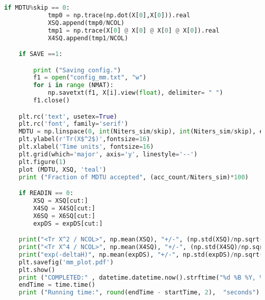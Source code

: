 \begin{footnotesize}
\begin{lstlisting}[language=Python]
        if MDTU%skip == 0:
            tmp0 = np.trace(np.dot(X[0],X[0])).real
            XSQ.append(tmp0/NCOL)
            tmp1 = np.trace(X[0] @ X[0] @ X[0] @ X[0]).real
            X4SQ.append(tmp1/NCOL)

    if SAVE ==1:

        print ("Saving config.")
        f1 = open("config_mm.txt", "w")
        for i in range (NMAT):
            np.savetxt(f1, X[i].view(float), delimiter= " ")  
        f1.close()

    plt.rc('text', usetex=True)
    plt.rc('font', family='serif')
    MDTU = np.linspace(0, int(Niters_sim/skip), int(Niters_sim/skip), endpoint=True)
    plt.ylabel(r'Tr(X$^2$)',fontsize=16)
    plt.xlabel('Time units', fontsize=16)
    plt.grid(which='major', axis='y', linestyle='--')
    plt.figure(1)
    plot (MDTU, XSQ, 'teal') 
    print ("Fraction of MDTU accepted", (acc_count/Niters_sim)*100) 

    if READIN == 0:
        XSQ = XSQ[cut:]
        X4SQ = X4SQ[cut:]
        X6SQ = X6SQ[cut:]
        expDS = expDS[cut:] 

    print("<Tr X^2 / NCOL>", np.mean(XSQ), "+/-", (np.std(XSQ)/np.sqrt(np.size(XSQ) - 1.0)))
    print("<Tr X^4 / NCOL>", np.mean(X4SQ), "+/-", (np.std(X4SQ)/np.sqrt(np.size(X4SQ) - 1.0)))
    print("exp(-deltaH)", np.mean(expDS), "+/-", np.std(expDS)/np.sqrt(np.size(expDS) - 1.0))
    plt.savefig('mm_plot.pdf') 
    plt.show()
    print ("COMPLETED:" , datetime.datetime.now().strftime("%d %B %Y, %H:%M:%S"))
    endTime = time.time() 
    print ("Running time:", round(endTime - startTime, 2),  "seconds")

\end{lstlisting}
\end{footnotesize} 